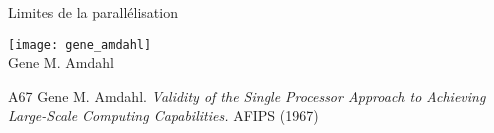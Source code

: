 
\begingroup

\begin{frame}{Limites de la parallélisation}

  \vFill

  \begin{center}
    \texttt{[image: gene\_amdahl]}\\
    Gene M. Amdahl
  \end{center}

  \vFill

  \begin{citing}
  \item[A67] Gene M. Amdahl. \textit{Validity of the Single Processor Approach to Achieving Large-Scale Computing Capabilities.} AFIPS (1967)
  \end{citing}
\end{frame}

\endgroup
\endinput

